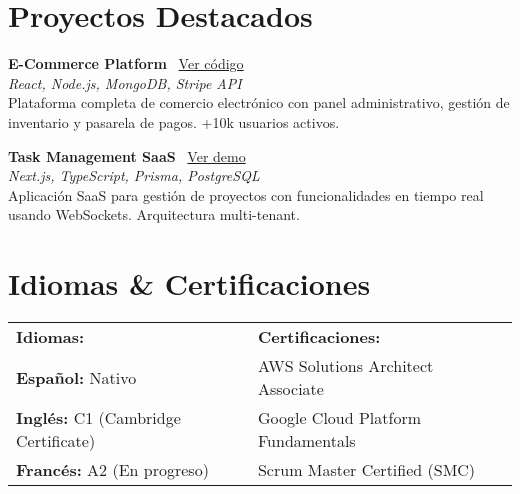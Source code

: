 \documentclass[11pt,a4paper]{article}
\begin{document}
\section{Proyectos Destacados}

\textbf{\color{primary}E-Commerce Platform} \hfill \textcolor{secondary}{\faGithub\ \href{https://github.com/tuusuario/ecommerce}{Ver código}}\\
\textit{\color{accent}React, Node.js, MongoDB, Stripe API}\\
Plataforma completa de comercio electrónico con panel administrativo, gestión de inventario y pasarela de pagos. +10k usuarios activos.

\vspace{8pt}

\textbf{\color{primary}Task Management SaaS} \hfill \textcolor{secondary}{\faGlobe\ \href{https://tuapp.com}{Ver demo}}\\
\textit{\color{accent}Next.js, TypeScript, Prisma, PostgreSQL}\\
Aplicación SaaS para gestión de proyectos con funcionalidades en tiempo real usando WebSockets. Arquitectura multi-tenant.

\section{Idiomas \& Certificaciones}

\begin{tabularx}{\textwidth}{X X}
    \textbf{\color{primary}Idiomas:} & \textbf{\color{primary}Certificaciones:} \\
    \textbf{Español:} Nativo & AWS Solutions Architect Associate \\
    \textbf{Inglés:} C1 (Cambridge Certificate) & Google Cloud Platform Fundamentals \\
    \textbf{Francés:} A2 (En progreso) & Scrum Master Certified (SMC) \\
\end{tabularx}
\end{document}
